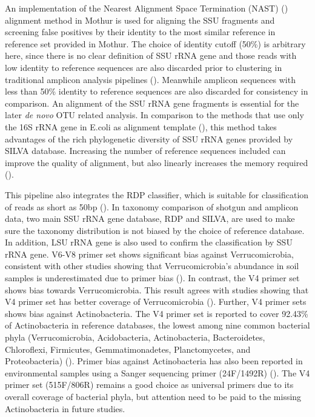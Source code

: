\documentclass[12pt]{article}
\begin{document}
An implementation of the Nearest Alignment Space Termination (NAST)
(\cite{mothuraligner2009}) alignment method in
Mothur is used for aligning the SSU fragments and screening false
positives by their identity to the most similar reference in
reference set provided in Mothur. The choice of identity cutoff (50\%)
is arbitrary here, since there is no clear definition of SSU rRNA gene
and those reads with low identity to reference sequences are also
discarded prior to clustering in traditional amplicon analysis pipelines
(\cite{rdp2009, mothur, qiime}). Meanwhile amplicon sequences with
less than 50\% identity to reference sequences are also discarded for
consistency in comparison. An alignment of the SSU rRNA gene fragments
is essential for the later {\em de novo} OTU related
analysis. In comparison to the methods that use only the 16S rRNA gene in
E.coli as alignment template (\cite{kostas2013}), this method takes
advantages of the rich phylogenetic diversity of SSU rRNA genes
provided by SILVA database. Increasing the number of reference
sequences included can improve the quality of alignment, but also
linearly increases the memory required
(\cite{mothuraligner2009,pynast}).

This pipeline also integrates the RDP classifier, which is suitable
for classification of reads as short as 50bp
(\cite{rdpclassifier}). In taxonomy comparison of shotgun and amplicon
data, two main SSU rRNA gene database, RDP and SILVA, are used to make
sure the taxonomy distribution is not biased by the choice of
reference database. In addition, LSU rRNA gene is also used to confirm
the classification by SSU rRNA gene. V6-V8 primer set shows
significant bias against Verrucomicrobia, consistent with other
studies showing that Verrucomicrobia's abundance in soil samples is
underestimated due to primer bias (\cite{verruco2011}). In contrast,
the V4 primer set shows bias towards Verrucomicrobia. This result agrees with
studies showing that V4 primer set has better coverage of
Verrucomicrobia (\cite{verruco2011}). Further, V4 primer sets shows
bias against Actinobacteria. The V4 primer set is reported to cover
92.43\% of Actinobacteria in reference databases, the lowest among
nine common bacterial phyla (Verrucomicrobia, Acidobacteria,
Actinobacteria, Bacteroidetes, Chloroflexi, Firmicutes,
Gemmatimonadetes, Planctomycetes, and Proteobacteria)
(\cite{verruco2011}). Primer bias against Actinobacteria has also been
reported in environmental samples using a Sanger sequencing primer
(24F/1492R) (\cite{actinobias}). The V4 primer set (515F/806R) remains a
good choice as universal primers due to its overall coverage of
bacterial phyla, but attention need to be paid to the missing
Actinobacteria in future studies.
\end{document}
